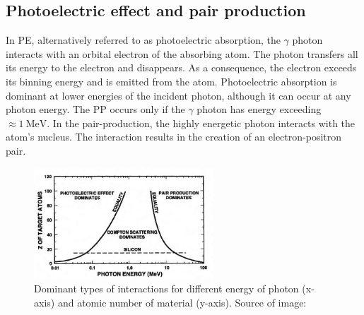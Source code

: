 \subsection{Photoelectric effect and pair production}
In \ac{PE}, alternatively referred to as photoelectric absorption, the $\gamma$ photon interacts with an orbital electron of the absorbing atom.
The photon transfers all its energy to the electron and disappears.
As a consequence, the electron exceeds its binning energy and is emitted from the atom.
Photoelectric absorption is dominant at lower energies of the incident photon, although it can occur at any photon energy.
The \ac{PP} occurs only if the $\gamma$ photon has energy exceeding $\approx \SI{1}{\mega\electronvolt}$.
In the pair-production, the highly energetic photon interacts with the atom's nucleus. 
The interaction results in the creation of an electron-positron pair.

\begin{figure}[!h]
  \centering 
    \includegraphics[width=0.6\textwidth]{./fig/photos/dominant.png}
  \caption{Dominant types of interactions for different energy of photon (x-axis) and atomic number of material (y-axis). Source of image: \cite{schwank}}
    \label{fig:dominant}
\end{figure}

